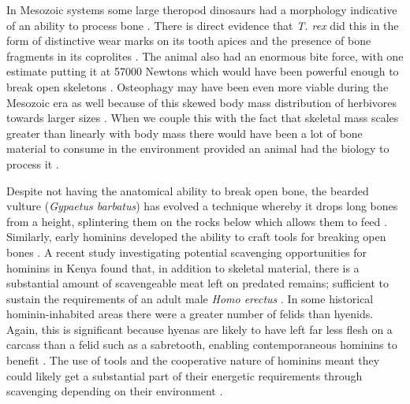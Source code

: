 \documentclass[a4paper,12pt]{article}
\begin{document}
In Mesozoic systems some large theropod dinosaurs had a morphology indicative of an ability to process bone \citep[e.g. the robust skull and dentition of \textit{Tyrannosaurus rex;}][]{hone2010feeding}.
There is direct evidence that \textit{T. rex} did this in the form of distinctive wear marks on its tooth apices \citep{farlow1994wear,schubert2005wear} and the presence of bone fragments in its coprolites \citep{chin1998king}.
The animal also had an enormous bite force, with one estimate putting it at 57000 Newtons \citep{bates2012estimating} which would have been powerful enough to break open skeletons \citep{rayfield2001cranial}.
Osteophagy may have been even more viable during the Mesozoic era as well because of this skewed body mass distribution of herbivores towards larger sizes \citep{10.1371/journal.pone.0051925}.
When we couple this with the fact that skeletal mass scales greater than linearly with body mass \citep{prange1979scaling} there would have been a lot of bone material to consume in the environment provided an animal had the biology to process it \citep{chure1997one}.

Despite not having the anatomical ability to break open bone, the bearded vulture (\textit{Gypaetus barbatus}) has evolved a technique whereby it drops long bones from a height, splintering them on the rocks below which allows them to feed \citep{margalida2008bearded}. 
Similarly, early hominins developed the ability to craft tools for breaking open bones \citep{ARCM:ARCM12084}.
A recent study investigating potential scavenging opportunities for hominins in Kenya found that, in addition to skeletal material, there is a substantial amount of scavengeable meat left on predated remains; sufficient to sustain the requirements of an adult male \textit{Homo erectus} \citep{pobiner2015new}.
In some historical hominin-inhabited areas there were a greater number of felids than hyenids.
Again, this is significant because hyenas are likely to have left far less flesh on a carcass than a felid such as a sabretooth, enabling contemporaneous hominins to benefit \citep{pobiner2015new}.
The use of tools and the cooperative nature of hominins meant they could likely get a substantial part of their energetic requirements through scavenging depending on their environment \citep{moleon2014humans}.
\end{document}
